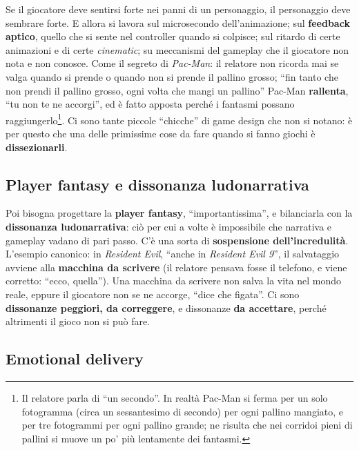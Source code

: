 Se il giocatore deve sentirsi forte nei panni di un personaggio, il
personaggio deve sembrare forte. E allora si lavora sul microsecondo
dell'animazione; sul \textbf{feedback aptico}, quello che si sente nel
controller quando si colpisce; sul ritardo di certe animazioni e di certe
\emph{cinematic}; su meccanismi del gameplay che il giocatore non nota e non
conosce. Come il segreto di \emph{Pac-Man}: il relatore non ricorda mai se
valga quando si prende o quando non si prende il pallino grosso; ``fin tanto
che non prendi il pallino grosso, ogni volta che mangi un pallino'' Pac-Man
\textbf{rallenta}, ``tu non te ne accorgi'', ed è fatto apposta perché i
fantasmi possano raggiungerlo\footnote{Il relatore parla di ``un secondo''.
In realtà Pac-Man si ferma per un solo fotogramma (circa un sessantesimo di
secondo) per ogni pallino mangiato, e per tre fotogrammi per ogni pallino
grande; ne risulta che nei corridoi pieni di pallini si muove un po' più
lentamente dei fantasmi.}. Ci sono tante piccole ``chicche'' di game design
che non si notano: è per questo che una delle primissime cose da fare quando
si fanno giochi è \textbf{dissezionarli}.

\subsection{Player fantasy e dissonanza ludonarrativa}

Poi bisogna progettare la \textbf{player fantasy}, ``importantissima'', e
bilanciarla con la \textbf{dissonanza ludonarrativa}: ciò per cui a volte è
impossibile che narrativa e gameplay vadano di pari passo. C'è una sorta di
\textbf{sospensione dell'incredulità}. L'esempio canonico: in
\emph{Resident Evil}, ``anche in \emph{Resident Evil 9}'', il salvataggio
avviene alla \textbf{macchina da scrivere} (il relatore pensava fosse il
telefono, e viene corretto: ``ecco, quella''). Una macchina da scrivere non
salva la vita nel mondo reale, eppure il giocatore non se ne accorge, ``dice
che figata''. Ci sono \textbf{dissonanze peggiori, da correggere}, e
dissonanze \textbf{da accettare}, perché altrimenti il gioco non si può
fare.

\subsection{Emotional delivery}

